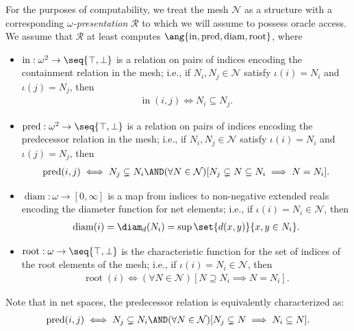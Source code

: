 For the purposes of computability, we treat the mesh $\mathcal{N}$ as a structure with a corresponding $\omega$\textit{-presentation} $\mathscr{R}$ to which we will assume to possess oracle access. We assume that $\mathscr{R}$ at least computes $\ang{\operatorname{in}, \operatorname{pred}, \operatorname{diam}, \operatorname{root}}$, where
\begin{itemize}
    \item $\operatorname{in}: \omega^2 \to \seq{\top, \bot}$ is a relation on pairs of indices encoding the containment relation in the mesh; i.e., if $N_i, N_j \in \mathcal{N}$ satisfy $\iota(i) = N_i$ and $\iota(j) = N_j$, then
    \begin{align*}
        \operatorname{in}(i, j) \iff N_i \subseteq N_j.
    \end{align*}
    \item $\operatorname{pred}: \omega^2 \to \seq{\top, \bot}$ is a relation on pairs of indices encoding the predecessor relation in the mesh; i.e., if $N_i, N_j \in \mathcal{N}$ satisfy $\iota(i) = N_i$ and $\iota(j) = N_j$, then
    \begin{align*}
        \operatorname{pred}(i, j) \iff N_j \subsetneq N_i \AND (\forall N \in \mathcal{N}) [N_j \subsetneq N \subseteq N_i \implies N = N_i].
    \end{align*}
    \item $\operatorname{diam}: \omega \to [0, \infty]$ is a map from indices to non-negative extended reals encoding the diameter function for net elements; i.e., if $\iota(i) = N_i \in \mathcal{N}$, then
    \begin{align*}
        \operatorname{diam}(i) = \diam_d(N_i) = \sup \set{d(x, y)}{x, y \in N_i}.
    \end{align*}
    \item $\operatorname{root} : \omega \to \seq{\top, \bot}$ is the characteristic function for the set of indices of the root elements of the mesh; i.e., if $\iota(i) = N_i \in \mathcal{N}$, then
    \begin{align*}
        \operatorname{root}(i) \iff (\forall N \in \mathcal{N})[N \supseteq N_i \implies N = N_i].
    \end{align*}
\end{itemize}
Note that in net spaces, the predecessor relation is equivalently characterized as:
\begin{align*}
    \operatorname{pred}(i, j) \iff N_j \subsetneq N_i \AND (\forall N \in \mathcal{N}) [N_j \subsetneq N \implies N_i \subseteq N].
\end{align*}

